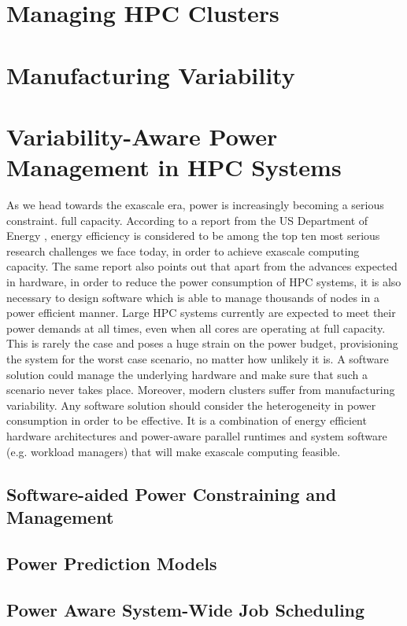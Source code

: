 \section{Managing HPC Clusters}
\label{sec:cluster_management}

\section{Manufacturing Variability}
\label{sec:process_variability}

\section{Variability-Aware Power Management in HPC Systems}
\label{sec:power_management}

As we head towards the exascale era, power is increasingly becoming a serious constraint.
full capacity.  According to a report from the US Department of Energy
\cite{ASCAC:tech:2014}, energy efficiency is considered to be among the top ten most
serious research challenges we face today, in order to achieve exascale computing
capacity.  The same report also points out that apart from the advances expected in
hardware, in order to reduce the power consumption of HPC systems, it is also necessary to
design software which is able to manage thousands of nodes in a power efficient manner.
Large HPC systems currently are expected to meet their power demands at all times, even
when all cores are operating at full capacity. This is rarely the case and poses a huge
strain on the power budget, provisioning the system for the worst case scenario, no matter
how unlikely it is.  A software solution could manage the underlying hardware and make
sure that such a scenario never takes place.  Moreover, modern clusters suffer from
manufacturing variability.  Any software solution should consider the heterogeneity in
power consumption in order to be effective.  It is a combination of energy efficient
hardware architectures and power-aware parallel runtimes and system software (e.g.
workload managers) that will make exascale computing feasible.       

\subsection{Software-aided Power Constraining and Management}

\subsection{Power Prediction Models}

\subsection{Power Aware System-Wide Job Scheduling}
\label{sec:power_aware_job_sched}


